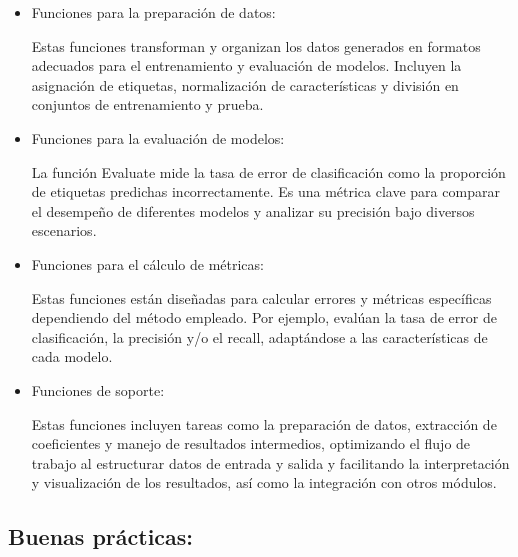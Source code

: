 \documentclass{report}
\begin{document}
\begin{itemize}
\item Funciones para la preparación de datos: 

Estas funciones transforman y organizan los datos generados en formatos adecuados para el entrenamiento y evaluación de modelos. Incluyen la asignación de etiquetas, normalización de características y división en conjuntos de entrenamiento y prueba.

\item Funciones para la evaluación de modelos:  

La función Evaluate mide la tasa de error de clasificación como la proporción de etiquetas predichas incorrectamente. Es una métrica clave para comparar el desempeño de diferentes modelos y analizar su precisión bajo diversos escenarios.

\item Funciones para el cálculo de métricas:

Estas funciones están diseñadas para calcular errores y métricas específicas dependiendo del método empleado. Por ejemplo, evalúan la tasa de error de clasificación, la precisión y/o el recall, adaptándose a las características de cada modelo. 

\item Funciones de soporte:

Estas funciones incluyen tareas como la preparación de datos, extracción de coeficientes y manejo de resultados intermedios, optimizando el flujo de trabajo al estructurar datos de entrada y salida y facilitando la interpretación y visualización de los resultados, así como la integración con otros módulos.

\end{itemize}


\subsection*{Buenas prácticas:}
\end{document}
